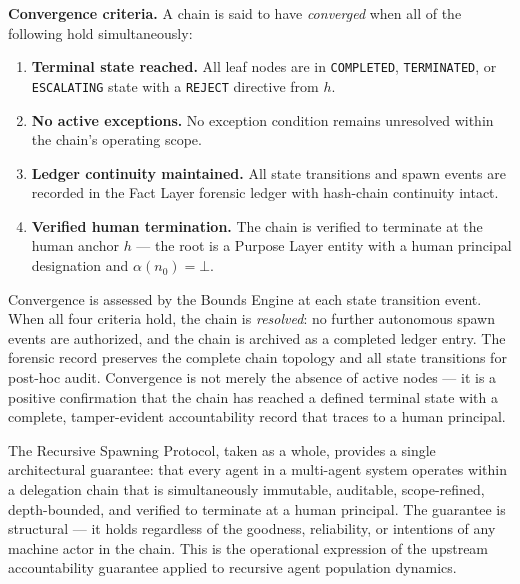 \medskip
\noindent\textbf{Convergence criteria.} A chain is said to have \emph{converged} when all of the following hold simultaneously:

\begin{enumerate}
    \item[(C1)] \textbf{Terminal state reached.} All leaf nodes are in \texttt{COMPLETED}, \texttt{TERMINATED}, or \texttt{ESCALATING} state with a \texttt{REJECT} directive from $h$.

    \item[(C2)] \textbf{No active exceptions.} No exception condition remains unresolved within the chain's operating scope.

    \item[(C3)] \textbf{Ledger continuity maintained.} All state transitions and spawn events are recorded in the Fact Layer forensic ledger with hash-chain continuity intact.

    \item[(C4)] \textbf{Verified human termination.} The chain is verified to terminate at the human anchor $h$ — the root is a Purpose Layer entity with a human principal designation and $\alpha(n_0) = \bot$.
\end{enumerate}

Convergence is assessed by the Bounds Engine at each state transition event. When all four criteria hold, the chain is \emph{resolved}: no further autonomous spawn events are authorized, and the chain is archived as a completed ledger entry. The forensic record preserves the complete chain topology and all state transitions for post-hoc audit. Convergence is not merely the absence of active nodes — it is a positive confirmation that the chain has reached a defined terminal state with a complete, tamper-evident accountability record that traces to a human principal.

\medskip
The Recursive Spawning Protocol, taken as a whole, provides a single architectural guarantee: that every agent in a multi-agent system operates within a delegation chain that is simultaneously immutable, auditable, scope-refined, depth-bounded, and verified to terminate at a human principal. The guarantee is structural — it holds regardless of the goodness, reliability, or intentions of any machine actor in the chain. This is the operational expression of the upstream \bxthree{} accountability guarantee applied to recursive agent population dynamics.
